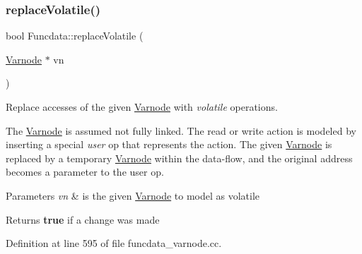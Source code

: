 \subsubsection{\texorpdfstring{replaceVolatile()}{replaceVolatile()}}
{\footnotesize\ttfamily bool Funcdata\+::replace\+Volatile (\begin{DoxyParamCaption}\item[{\mbox{\hyperlink{class_varnode}{Varnode}} $\ast$}]{vn }\end{DoxyParamCaption})}



Replace accesses of the given \mbox{\hyperlink{class_varnode}{Varnode}} with {\itshape volatile} operations. 

The \mbox{\hyperlink{class_varnode}{Varnode}} is assumed not fully linked. The read or write action is modeled by inserting a special {\itshape user} op that represents the action. The given \mbox{\hyperlink{class_varnode}{Varnode}} is replaced by a temporary \mbox{\hyperlink{class_varnode}{Varnode}} within the data-\/flow, and the original address becomes a parameter to the user op. 
\begin{DoxyParams}{Parameters}
{\em vn} & is the given \mbox{\hyperlink{class_varnode}{Varnode}} to model as volatile \\
\hline
\end{DoxyParams}
\begin{DoxyReturn}{Returns}
{\bfseries{true}} if a change was made 
\end{DoxyReturn}


Definition at line 595 of file funcdata\+\_\+varnode.\+cc.

